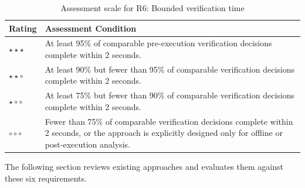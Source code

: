 \begin{table}[H]
\centering
\begin{tabular}{p{2.3cm} p{9.9cm}}
\hline
\textbf{Rating} & \textbf{Assessment Condition} \\ \hline

$\star\star\star$ &
At least 95\% of comparable pre-execution verification decisions complete
within 2 seconds. \\

$\star\star\circ$ &
At least 90\% but fewer than 95\% of comparable verification decisions complete
within 2 seconds. \\

$\star\circ\circ$ &
At least 75\% but fewer than 90\% of comparable verification decisions complete
within 2 seconds. \\

$\circ\circ\circ$ &
Fewer than 75\% of comparable verification decisions complete within
2 seconds, or the approach is explicitly designed only for offline or
post-execution analysis. \\


\hline
\end{tabular}
\caption{Assessment scale for R6: Bounded verification time}
\label{tab:r6_scale}
\end{table}


The following section reviews existing approaches and evaluates them against
these six requirements.
